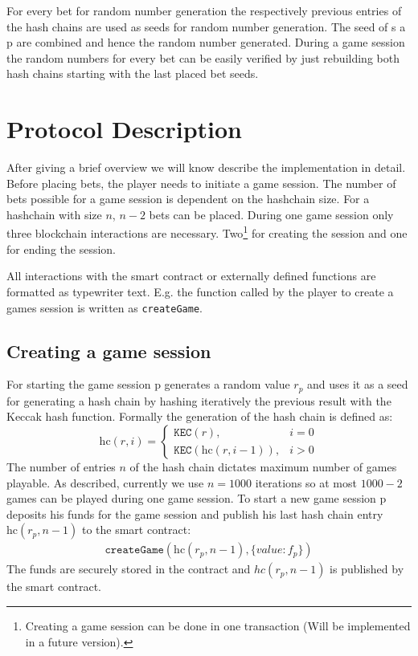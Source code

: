 \documentclass[oneside]{amsart}
\makeatletter
\newcommand*\Eg{E.g.\@\xspace}
\newcommand{\kec}{\texttt{KEC}}
\makeatother
\begin{document}
\begin{multicols}{2}
For every bet for random number generation the respectively  previous entries of the hash chains are used
as seeds for random number generation.
The seed of \gls{s} a \gls{p} are combined and hence the random number generated.
During a game session the random numbers for every bet can be easily verified by just rebuilding both hash chains
starting with the last placed bet seeds.

\section{Protocol Description}\label{sec:protocolDescription}
After giving a brief overview we will know describe the implementation in detail.
Before placing bets, the player needs to initiate a game session.
The number of bets possible for a game session is dependent on the hashchain size.
For a hashchain with size $n$, $n - 2$ bets can be placed.
During one game session only three blockchain interactions are necessary.
Two\footnote{Creating a game session can be done in one transaction (Will be implemented in a future version).}
for creating the session and one for ending the session.

All interactions with the smart contract or externally defined functions are formatted as typewriter text.
\Eg the function called by the player to create a games session is written as \texttt{createGame}.

\subsection{Creating a game session}\label{subsec:creatingGameSession}
For starting the game session \gls{p} generates a random value $r_p$ and uses it as a seed for generating a hash chain by hashing iteratively the
previous result with the Keccak hash function.
Formally the generation of the hash chain is defined as:
\begin{equation}
    \text{hc}(r, i) =
    \begin{cases}
        \kec(r), & i = 0 \\
        \kec(\text{hc}(r, i-1)), & i > 0
    \end{cases}
\end{equation}
The number of entries $n$ of the hash chain dictates maximum number of games playable.
As described, currently we use $n = 1000$ iterations so at most $1000 - 2$ games can be played during one game session.
To start a new game session \gls{p} deposits his funds for the game session and publish his
last hash chain entry $\text{hc}(r_p, n - 1)$ to the smart contract:
\begin{align}
    \texttt{createGame}(\text{hc}(r_p, n - 1), \lbrace value: f_p \rbrace)
\end{align}
The funds are securely stored in the contract and $hc(r_p, n - 1)$  is published by the smart contract.


\end{multicols}
\end{document}

